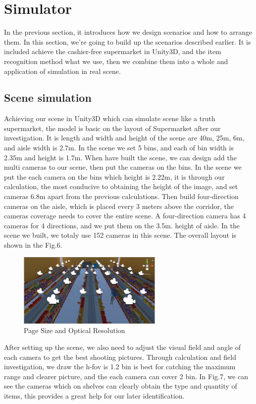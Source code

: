 \section{Simulator}

In the previous section, it introduces how we design scenarios and how to arrange them.
In this section, we're going to build up the scenarios described earlier.
It is included achieve the cashier-free supermarket in Unity3D, and the item recognition method what we use, then we combine them into a whole and application of simulation in real scene.

\subsection{Scene simulation}

Achieving our scene in Unity3D  which can simulate scene like a truth supermarket, the model is basic on the layout of Supermarket after our investigation.
It is length and width and height of the scene are 40m, 25m, 6m, and aisle width is 2.7m.
In the scene we set 5 bins, and each of bin width is 2.35m and height is 1.7m.
When have built the scene, we can design add the multi cameras to our scene, then put the cameras on the bins.
In the scene we put the each camera on the bins which height is 2.22m, it is through our calculation, the most conducive to obtaining the height of the image, and set cameras 6.8m apart from the previous calculations.
Then build four-direction cameras on the aisle, which is placed every 3 meters above the corridor, the cameras coverage needs to cover the entire scene.
A four-direction camera has 4 cameras for 4 directions, and we put them on the 3.5m. height of aisle.
In the scene we built, we totaly use 152 cameras in this scene.
The overall layout is shown in the Fig.6.

\begin{figure}[htbp]
\centerline{\includegraphics[width=7cm,scale=0.8]{supermarket.jpg}}
\caption{Page Size and Optical Resolution}
\label{fig}
\end{figure}

After setting up the scene, we also need to adjust the visual field and angle of each camera to get the best shooting pictures.
Through calculation and field investigation, we draw the h-fov is 1.2 bin is best for catching the maximum range and clearer picture, and the each camera can cover 2 bin.
In Fig.7, we can see the cameras which on shelves can clearly obtain the type and quantity of items, this provides a great help for our later identification.

